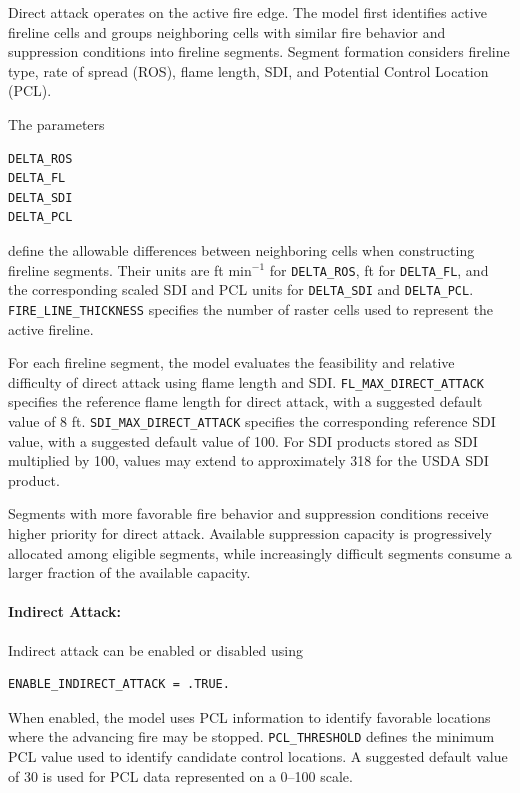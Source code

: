 Direct attack operates on the active fire edge. The model first identifies active
fireline cells and groups neighboring cells with similar fire behavior and
suppression conditions into fireline segments. Segment formation considers
fireline type, rate of spread (ROS), flame length, SDI, and Potential Control
Location (PCL).

The parameters

\begin{verbatim}
DELTA_ROS
DELTA_FL
DELTA_SDI
DELTA_PCL
\end{verbatim}

define the allowable differences between neighboring cells when constructing
fireline segments. Their units are ft min$^{-1}$ for \verb|DELTA_ROS|, ft for
\verb|DELTA_FL|, and the corresponding scaled SDI and PCL units for
\verb|DELTA_SDI| and \verb|DELTA_PCL|. \verb|FIRE_LINE_THICKNESS| specifies
the number of raster cells used to represent the active fireline.

For each fireline segment, the model evaluates the feasibility and relative
difficulty of direct attack using flame length and SDI. 
\verb|FL_MAX_DIRECT_ATTACK| specifies the reference flame length for direct
attack, with a suggested default value of 8 ft. 
\verb|SDI_MAX_DIRECT_ATTACK| specifies the corresponding reference SDI value,
with a suggested default value of 100. For SDI products stored as SDI multiplied
by 100, values may extend to approximately 318 for the USDA SDI product.

Segments with more favorable fire behavior and suppression conditions receive
higher priority for direct attack. Available suppression capacity is progressively
allocated among eligible segments, while increasingly difficult segments consume
a larger fraction of the available capacity.

\paragraph{Indirect Attack:}

Indirect attack can be enabled or disabled using

\begin{verbatim}
ENABLE_INDIRECT_ATTACK = .TRUE.
\end{verbatim}

When enabled, the model uses PCL information to identify favorable locations
where the advancing fire may be stopped. \verb|PCL_THRESHOLD| defines the
minimum PCL value used to identify candidate control locations. A suggested
default value of 30 is used for PCL data represented on a 0--100 scale.

